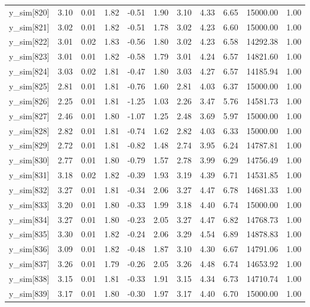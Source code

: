 \begin{table}[ht]
\begin{tabular}{rrrrrrrrrrr}
  y\_sim[820] & 3.10 & 0.01 & 1.82 & -0.51 & 1.90 & 3.10 & 4.33 & 6.65 & 15000.00 & 1.00 \\ 
  y\_sim[821] & 3.02 & 0.01 & 1.82 & -0.51 & 1.78 & 3.02 & 4.23 & 6.60 & 15000.00 & 1.00 \\ 
  y\_sim[822] & 3.01 & 0.02 & 1.83 & -0.56 & 1.80 & 3.02 & 4.23 & 6.58 & 14292.38 & 1.00 \\ 
  y\_sim[823] & 3.01 & 0.01 & 1.82 & -0.58 & 1.79 & 3.01 & 4.24 & 6.57 & 14821.60 & 1.00 \\ 
  y\_sim[824] & 3.03 & 0.02 & 1.81 & -0.47 & 1.80 & 3.03 & 4.27 & 6.57 & 14185.94 & 1.00 \\ 
  y\_sim[825] & 2.81 & 0.01 & 1.81 & -0.76 & 1.60 & 2.81 & 4.03 & 6.37 & 15000.00 & 1.00 \\ 
  y\_sim[826] & 2.25 & 0.01 & 1.81 & -1.25 & 1.03 & 2.26 & 3.47 & 5.76 & 14581.73 & 1.00 \\ 
  y\_sim[827] & 2.46 & 0.01 & 1.80 & -1.07 & 1.25 & 2.48 & 3.69 & 5.97 & 15000.00 & 1.00 \\ 
  y\_sim[828] & 2.82 & 0.01 & 1.81 & -0.74 & 1.62 & 2.82 & 4.03 & 6.33 & 15000.00 & 1.00 \\ 
  y\_sim[829] & 2.72 & 0.01 & 1.81 & -0.82 & 1.48 & 2.74 & 3.95 & 6.24 & 14787.81 & 1.00 \\ 
  y\_sim[830] & 2.77 & 0.01 & 1.80 & -0.79 & 1.57 & 2.78 & 3.99 & 6.29 & 14756.49 & 1.00 \\ 
  y\_sim[831] & 3.18 & 0.02 & 1.82 & -0.39 & 1.93 & 3.19 & 4.39 & 6.71 & 14531.85 & 1.00 \\ 
  y\_sim[832] & 3.27 & 0.01 & 1.81 & -0.34 & 2.06 & 3.27 & 4.47 & 6.78 & 14681.33 & 1.00 \\ 
  y\_sim[833] & 3.20 & 0.01 & 1.80 & -0.33 & 1.99 & 3.18 & 4.40 & 6.74 & 15000.00 & 1.00 \\ 
  y\_sim[834] & 3.27 & 0.01 & 1.80 & -0.23 & 2.05 & 3.27 & 4.47 & 6.82 & 14768.73 & 1.00 \\ 
  y\_sim[835] & 3.30 & 0.01 & 1.82 & -0.24 & 2.06 & 3.29 & 4.54 & 6.89 & 14878.83 & 1.00 \\ 
  y\_sim[836] & 3.09 & 0.01 & 1.82 & -0.48 & 1.87 & 3.10 & 4.30 & 6.67 & 14791.06 & 1.00 \\ 
  y\_sim[837] & 3.26 & 0.01 & 1.79 & -0.26 & 2.05 & 3.26 & 4.48 & 6.74 & 14653.92 & 1.00 \\ 
  y\_sim[838] & 3.15 & 0.01 & 1.81 & -0.33 & 1.91 & 3.15 & 4.34 & 6.73 & 14710.74 & 1.00 \\ 
  y\_sim[839] & 3.17 & 0.01 & 1.80 & -0.30 & 1.97 & 3.17 & 4.40 & 6.70 & 15000.00 & 1.00 \\ 

\end{tabular}
\end{table}
